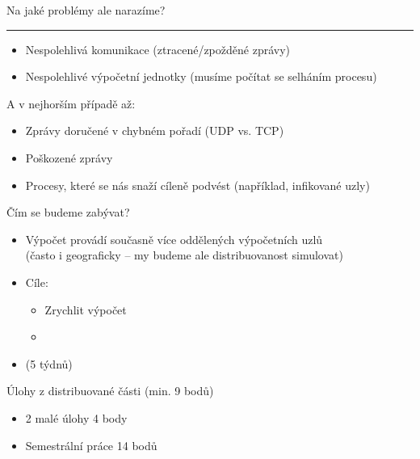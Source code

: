 \documentclass[usenames,dvipsnames,9pt]{beamer}
\begin{document}
\begin{frame}

  \begin{center}
    \LARGE Na jaké problémy ale narazíme?
  \end{center}

  \pause\vspace{1em}\hrule\vspace{1em}

  \begin{itemize}
    \item Nespolehlivá komunikace (ztracené/zpožděné zprávy)
    \item Nespolehlivé výpočetní jednotky (musíme počítat se selháním procesu)
  \end{itemize}

  \pause\vspace{0.8em}
  A v nejhorším případě až:
  \begin{itemize}
    \item Zprávy doručené v chybném pořadí (UDP vs. TCP)
    \item Poškozené zprávy
    \item Procesy, které se nás snaží cíleně podvést (například, infikované uzly)
  \end{itemize}

\end{frame}


\begin{frame}
\begin{block}{Čím se budeme zabývat?}
      \begin{itemize}
        \item Výpočet provádí současně více oddělených výpočetních uzlů\\
              {\small (často i geograficky -- my budeme ale distribuovanost simulovat)} \\[1em]
        \item Cíle:
              \begin{itemize}
                \item Zrychlit výpočet
                \item {}
              \end{itemize}\vspace{1em}
        \item {\small (5 týdnů)}
      \end{itemize}
    \end{block}

  \begin{block}{Úlohy z distribuované části \normalfont(min. 9 bodů)}
    \begin{itemize}
      \item 2 malé úlohy                 \hfill  4 body
      \item Semestrální práce            \hfill 14 bodů
    \end{itemize}
  \end{block}
\end{frame}
\end{document}
